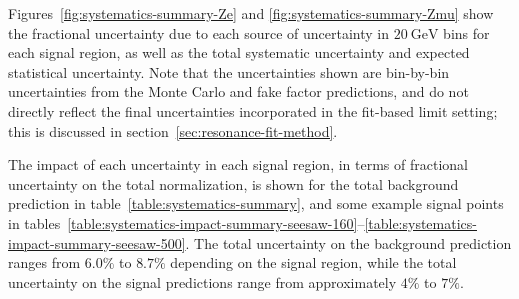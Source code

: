 Figures~\ref{fig:systematics-summary-Ze} and \ref{fig:systematics-summary-Zmu} show the fractional uncertainty due to each source of uncertainty in $\SI{20}{\giga\electronvolt}$ bins for each signal region, as well as the total systematic uncertainty and expected statistical uncertainty. Note that the uncertainties shown are bin-by-bin uncertainties from the Monte Carlo and fake factor predictions, and do not directly reflect the final uncertainties incorporated in the fit-based limit setting; this is discussed in section~\ref{sec:resonance-fit-method}.  %

The impact of each uncertainty in each signal region, in terms of fractional uncertainty on the total normalization, is shown for the total background prediction in table~\ref{table:systematics-summary}, and some example signal points in tables~\ref{table:systematics-impact-summary-seesaw-160}--\ref{table:systematics-impact-summary-seesaw-500}. The total uncertainty on the background prediction ranges from $6.0\%$ to $8.7\%$ depending on the signal region, while the total uncertainty on the signal predictions range from approximately $4\%$ to $7\%$. 



